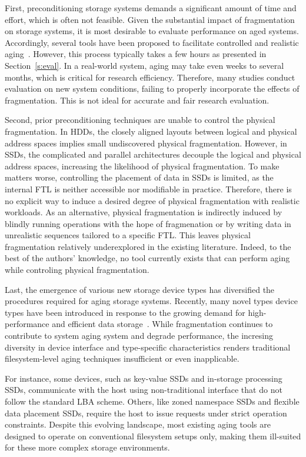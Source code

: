First, preconditioning storage systems demands a significant amount of time and effort, which is often not feasible.
Given the substantial impact of fragmentation on storage systems, it is most desirable to evaluate performance on aged systems.
Accordingly, several tools have been proposed to facilitate controlled and realistic aging~\cite{tools,studies}.
However, this process typically takes a few hours as presented in Section~\ref{s:eval}.
In a real-world system, aging may take even weeks to several months, which is critical for research efficiency.
Therefore, many studies conduct evaluation on new system conditions, failing to properly incorporate the effects of fragmentation.
This is not ideal for accurate and fair research evaluation.

Second, prior preconditioning techniques are unable to control the physical fragmentation.
In HDDs, the closely aligned layouts between logical and physical address spaces implies small undiscovered physical fragmentation.
However, in SSDs, the complicated and parallel architectures decouple the logical and physical address spaces, increasing the likelihood of physical fragmentation.
To make matters worse, controlling the placement of data in SSDs is limited, as the internal FTL is neither accessible nor modifiable in practice.
Therefore, there is no explicit way to induce a desired degree of physical fragmentation with realistic workloads.
As an alternative, physical fragmentation is indirectly induced by blindly running operations with the hope of fragmenation or by writing data in unrealistic sequences tailored to a specific FTL.
This leaves physical fragmentation relatively underexplored in the existing literature.
Indeed, to the best of the authors' knowledge, no tool currently exists that can perform aging while controling physical fragmentation.

Last, the emergence of various new storage device types has diversified the procedures required for aging storage systems.
Recently, many novel types device types have been introduced in response to the growing demand for high-performance and efficient data storage~\cite{NEEDED,NEEDED,NEEDED}.
While fragmentation continues to contribute to system aging system and degrade performance, the incresing diversity in device interface and type-specific characteristics renders traditional filesystem-level aging techniques insufficient or even inapplicable.

For instance, some devices, such as key-value SSDs and in-storage processing SSDs, communicate with the host using non-traditional interface that do not follow the standard LBA scheme.
Others, like zoned namespace SSDs and flexible data placement SSDs, require the host to issue requests under strict operation constraints.
Despite this evolving landscape, most existing aging tools are designed to operate on conventional filesystem setups only, making them ill-suited for these more complex storage environments.


